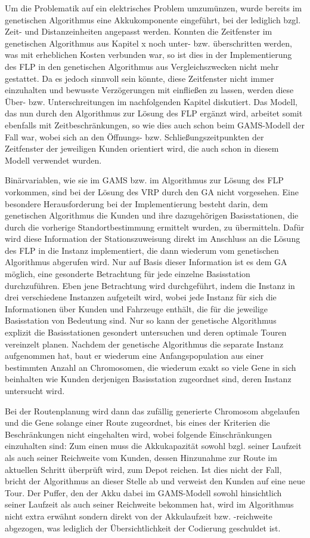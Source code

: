 \documentclass[a4paper,12pt,parskip,bibtotoc,liststotoc]{article}
\begin{document}
Um die Problematik auf ein elektrisches Problem umzumünzen, wurde bereits im genetischen Algorithmus eine Akkukomponente eingeführt, bei der lediglich bzgl. Zeit- und Distanzeinheiten angepasst werden.
Konnten die Zeitfenster im genetischen Algorithmus aus Kapitel x noch unter- bzw. überschritten werden, was mit erheblichen Kosten verbunden war, so ist dies in der Implementierung des FLP in den genetischen Algorithmus aus Vergleichszwecken nicht mehr gestattet. 
Da es jedoch sinnvoll sein könnte, diese Zeitfenster nicht immer einzuhalten und bewusste Verzögerungen mit einfließen zu lassen, werden diese Über- bzw. Unterschreitungen im nachfolgenden Kapitel diskutiert.
Das Modell, das nun durch den Algorithmus zur Lösung des FLP ergänzt wird, arbeitet somit ebenfalls mit Zeitbeschränkungen, so wie dies auch schon beim GAMS-Modell der Fall war, wobei sich an den Öffnungs- bzw. Schließungszeitpunkten der Zeitfenster der jeweiligen Kunden orientiert wird, die auch schon in diesem Modell verwendet wurden.

Binärvariablen, wie sie im GAMS bzw. im Algorithmus zur Lösung des FLP vorkommen, sind bei der Lösung des VRP durch den GA nicht vorgesehen.
Eine besondere Herausforderung bei der Implementierung besteht darin, dem genetischen Algorithmus die Kunden und ihre dazugehörigen Basisstationen, die durch die vorherige Standortbestimmung ermittelt wurden, zu übermitteln.
Dafür wird diese Information der Stationszuweisung direkt im Anschluss an die Lösung des FLP in die Instanz implementiert, die dann wiederum vom genetischen Algorithmus abgerufen wird.
Nur auf Basis dieser Information ist es dem GA möglich, eine gesonderte Betrachtung für jede einzelne Basisstation durchzuführen.
Eben jene Betrachtung wird durchgeführt, indem die Instanz in drei verschiedene Instanzen aufgeteilt wird, wobei jede Instanz für sich die Informationen über Kunden und Fahrzeuge enthält, die für die jeweilige Basisstation von Bedeutung sind.
Nur so kann der genetische Algorithmus explizit die Basisstationen gesondert untersuchen und deren optimale Touren vereinzelt planen. 
Nachdem der genetische Algorithmus die separate Instanz aufgenommen hat, baut er wiederum eine Anfangspopulation aus einer bestimmten Anzahl an Chromosomen, die wiederum exakt so viele Gene in sich beinhalten wie Kunden derjenigen Basisstation zugeordnet sind, deren Instanz untersucht wird.

Bei der Routenplanung wird dann das zufällig generierte Chromosom abgelaufen und die Gene solange einer Route zugeordnet, bis eines der Kriterien die Beschränkungen nicht eingehalten wird, wobei folgende Einschränkungen einzuhalten sind: 
Zum einen muss die Akkukapazität sowohl bzgl. seiner Laufzeit als auch seiner Reichweite vom Kunden, dessen Hinzunahme zur Route im aktuellen Schritt überprüft wird, zum Depot reichen. 
Ist dies nicht der Fall, bricht der Algorithmus an dieser Stelle ab und verweist den Kunden auf eine neue Tour.
Der Puffer, den der Akku dabei im GAMS-Modell sowohl hinsichtlich seiner Laufzeit als auch seiner Reichweite bekommen hat, wird im Algorithmus nicht extra erwähnt sondern direkt von der Akkulaufzeit bzw. -reichweite abgezogen, was lediglich der Übersichtlichkeit der Codierung geschuldet ist.
\end{document}

